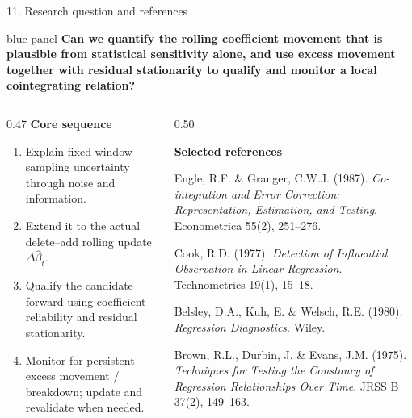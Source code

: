 \documentclass[aspectratio=169,10pt]{beamer}
\newenvironment{bluepanel}{\begin{beamercolorbox}[wd=\linewidth,sep=0.16cm,rounded=true]{blue panel}}{\end{beamercolorbox}}
\begin{document}
\begin{frame}{11. Research question and references}
\begin{bluepanel}
\centering\bfseries
Can we quantify the rolling coefficient movement that is plausible from statistical sensitivity alone, and use excess movement together with residual stationarity to qualify and monitor a local cointegrating relation?
\end{bluepanel}

\vspace{0.12cm}
\begin{columns}[T,onlytextwidth]
\begin{column}{0.47\textwidth}
\textbf{Core sequence}
\begin{enumerate}\setlength\itemsep{0.08cm}
\item Explain fixed-window sampling uncertainty through noise and information.
\item Extend it to the actual delete--add rolling update $\Delta\hat\beta_t$.
\item Qualify the candidate forward using coefficient reliability and residual stationarity.
\item Monitor for persistent excess movement / breakdown; update and revalidate when needed.
\end{enumerate}
\end{column}
\begin{column}{0.50\textwidth}
{\fontsize{5.55}{6.25}\selectfont
\textbf{Selected references}\par\vspace{0.045cm}
Engle, R.F. \& Granger, C.W.J. (1987). \emph{Co-integration and Error Correction: Representation, Estimation, and Testing}. Econometrica 55(2), 251--276.\par\vspace{0.04cm}
Cook, R.D. (1977). \emph{Detection of Influential Observation in Linear Regression}. Technometrics 19(1), 15--18.\par\vspace{0.04cm}
Belsley, D.A., Kuh, E. \& Welsch, R.E. (1980). \emph{Regression Diagnostics}. Wiley.\par\vspace{0.04cm}
Brown, R.L., Durbin, J. \& Evans, J.M. (1975). \emph{Techniques for Testing the Constancy of Regression Relationships Over Time}. JRSS B 37(2), 149--163.\par\vspace{0.04cm}
}
\end{column}
\end{columns}
\end{frame}
\end{document}
